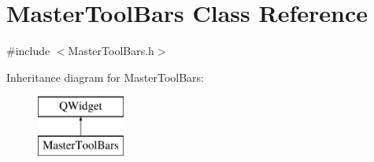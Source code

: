 \hypertarget{class_master_tool_bars}{\section{Master\-Tool\-Bars Class Reference}
\label{class_master_tool_bars}
}


{\ttfamily \#include $<$Master\-Tool\-Bars.\-h$>$}

Inheritance diagram for Master\-Tool\-Bars\-:\begin{figure}[H]
\begin{center}
\leavevmode
\includegraphics[height=2.000000cm]{class_master_tool_bars}
\end{center}
\end{figure}
